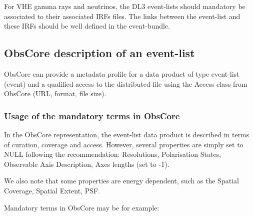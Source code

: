 \documentclass[11pt,a4paper]{ivoa}
\begin{document}
{For \gls{VHE} gamma rays and neutrinos, the DL3 event-lists should mandatory be associated to their associated \gls{IRF}s files. The
links between the event-list and these \gls{IRF}s should be well defined in the event-bundle.


\subsection{ObsCore description of an event-list}
\label{sec:obscore_he}

%


ObsCore \citep{2017ivoa.spec.0509L} can provide a metadata profile for a data product of type event-list (event) and a qualified access to the distributed file using the Access class from ObsCore (URL, format, file size).

\subsubsection{Usage of the mandatory terms in ObsCore}

In the ObsCore representation, the event-list data product is described in terms of curation, coverage and access. However, several properties are simply set to NULL following the recommendation: Resolutions, Polarisation States, Observable Axis Description, Axes lengths (set to -1).

We also note that some properties are energy dependent, such as the Spatial Coverage, Spatial Extent, \gls{PSF}.


Mandatory terms in ObsCore may be for example:

}
\end{document}
